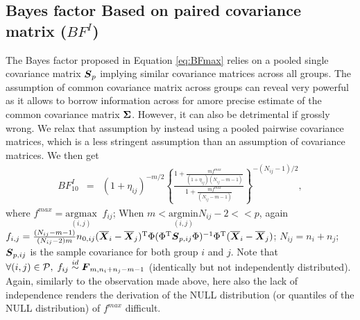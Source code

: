 \documentclass[12pt]{article}
\theoremstyle{plain}%
\theoremstyle{definition}
\def\be{\begin{eqnarray}}
\def\ee{\end{eqnarray}}
\def\trans{^{\rm T}}
\newcommand{\uF}       {\mbox{\boldmath$F$}}
\newcommand{\uI}       {\mbox{\boldmath$I$}}
\newcommand{\uR}       {\mbox{\boldmath$R$}}
\newcommand{\uS}       {\mbox{\boldmath$S$}}
\newcommand{\uX}       {\mbox{\boldmath$X$}}
\newcommand{\uSigma}            {\mbox{\boldmath$\Sigma$}}
\newcommand{\uPhi}              {\mbox{\boldmath$\Phi$}}
\begin{document}
\subsection{Bayes factor Based on paired covariance matrix ($BF^{I}$)} \label{sec:testid}
The Bayes factor proposed in Equation \ref{eq:BFmax} relies on a pooled single covariance matrix $\uS_p$ implying similar covariance matrices across all groups. The assumption of common covariance matrix across groups can reveal very powerful as it allows to borrow information across for amore precise estimate of the common covariance matrix $\uSigma$. However, it can also be detrimental if grossly wrong. We relax that assumption by instead using a pooled pairwise covariance matrices, which is a less stringent assumption than an assumption of covariance matrices. We then get
\be
BF^{I}_{10} &=& \left(1 + \eta_{ij} \right)^{-m/2} \left\{ \frac{  1 + \frac{m f^{max}}{(1 + \eta_{ij})(N_{ij}-m-1)}}{ 1 + \frac{m f^{max}}{(N_{ij}-m-1)}  } \right\}^{-(N_{ij}-1)/2}, \label{eq:BFmaxij}
\ee
where $f^{max} = \underset{(i,j)}{\mathrm{argmax}}\;\;f_{ij}$;
When $m < \underset{(i,j)}{\mathrm{argmin}} N_{ij} - 2 << p$, again $f_{i,j}  = \frac{(N_{ij}-m-1)}{(N_{ij}-2)m} n_{0,ij} (\overline{\uX}_i - \overline{\uX}_j)\trans\Phi (\Phi\trans\uS_{p,ij}\Phi)^{-1}\Phi\trans(\overline{\uX}_i - \overline{\uX}_j)$;
$N_{ij} = n_i +n_j$; $\uS_{p,ij}$ is the sample covariance for both group $i$ and $j$. Note that $\forall (i,j) \in \mathcal{P}, \; f_{ij} \stackrel{id}{\sim} \uF_{m, n_{i}+n_{j} - m- 1}$ (identically but not independently distributed). Again, similarly to the observation made above, here also the lack of independence renders the derivation of the NULL distribution (or quantiles of the NULL distribution) of $f^{max}$ difficult. %

\end{document}
